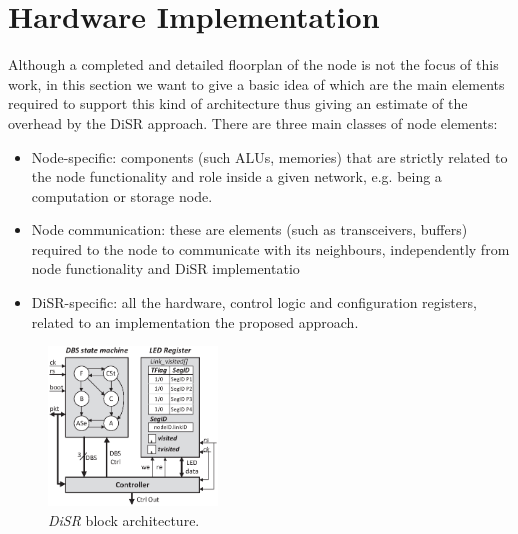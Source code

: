 
\section{Hardware Implementation}
\label{sec:implementation}

Although a completed and detailed floorplan of the node is not the
focus of this work, in this section we want to give a basic idea of
which are the main elements required to support this kind of
architecture thus giving an estimate of the overhead by the
DiSR approach. There are three main classes of node elements:
\begin{itemize}
\item Node-specific: components (such ALUs, memories) that are
strictly related to the node functionality and role inside a given
network, e.g. being a computation or storage node.
\item Node communication:  these are elements (such as transceivers,
buffers) required to the node to communicate with its neighbours,
independently from node functionality and DiSR implementatio
\item DiSR-specific: all the hardware, control logic and
configuration registers, related to an implementation the proposed approach.
\end{itemize}

\begin{figure}
  \centering
  \includegraphics[width=0.40\textwidth]{pictures/implementation.eps}
  \caption{\emph{DiSR} block architecture.}
 \label{fig:implementation}
\end{figure}

